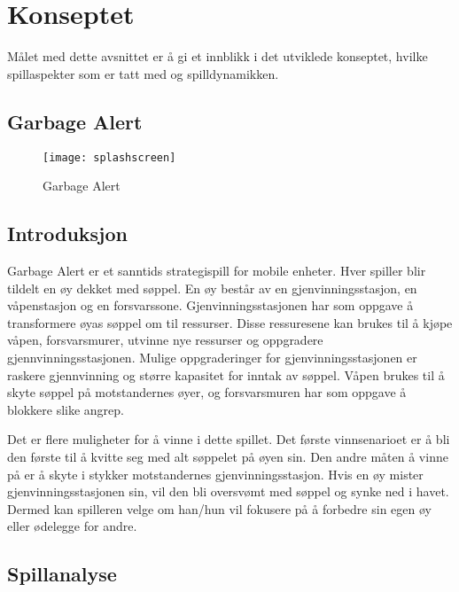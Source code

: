 \section{Konseptet}\label{sec:konsept}

Målet med dette avsnittet er å gi et innblikk i det utviklede konseptet,
hvilke spillaspekter som er tatt med og spilldynamikken.

\subsection{Garbage Alert}

			\begin{figure} [here]
				\begin{center}
					\texttt{[image: splashscreen]}
				\end{center}
			\caption{Garbage Alert}
		\end{figure}

\subsection{Introduksjon}


Garbage Alert er et sanntids strategispill for mobile enheter. Hver
spiller blir tildelt en øy dekket med søppel. En øy består av en
gjenvinningsstasjon, en våpenstasjon og en forsvarssone.
Gjenvinningsstasjonen har som oppgave å transformere øyas søppel om til
ressurser. Disse ressuresene kan brukes til å kjøpe våpen,
forsvarsmurer, utvinne nye ressurser og oppgradere
gjennvinningsstasjonen. Mulige oppgraderinger for gjenvinningsstasjonen
er raskere gjennvinning og større kapasitet for inntak av søppel. Våpen
brukes til å skyte søppel på motstandernes øyer, og forsvarsmuren har
som oppgave å blokkere slike angrep. 

Det er flere muligheter for å vinne i dette spillet. Det første
vinnsenarioet er å bli den første til å kvitte seg med alt søppelet på
øyen sin. Den andre måten å vinne på er å skyte i stykker motstandernes
gjenvinningsstasjon. Hvis en øy mister gjenvinningsstasjonen sin, vil
den bli oversvømt med søppel og synke ned i havet. Dermed kan spilleren
velge om han/hun vil fokusere på å forbedre sin egen øy eller ødelegge
for andre. 

\subsection{Spillanalyse}

